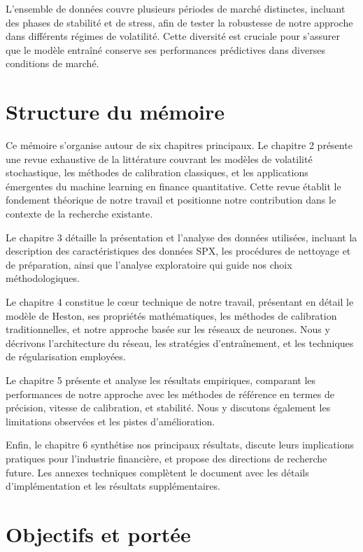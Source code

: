L'ensemble de données couvre plusieurs périodes de marché distinctes, incluant des phases de stabilité et de stress, afin de tester la robustesse de notre approche dans différents régimes de volatilité. Cette diversité est cruciale pour s'assurer que le modèle entraîné conserve ses performances prédictives dans diverses conditions de marché.

\section{Structure du mémoire}

Ce mémoire s'organise autour de six chapitres principaux. Le chapitre 2 présente une revue exhaustive de la littérature couvrant les modèles de volatilité stochastique, les méthodes de calibration classiques, et les applications émergentes du machine learning en finance quantitative. Cette revue établit le fondement théorique de notre travail et positionne notre contribution dans le contexte de la recherche existante.

Le chapitre 3 détaille la présentation et l'analyse des données utilisées, incluant la description des caractéristiques des données SPX, les procédures de nettoyage et de préparation, ainsi que l'analyse exploratoire qui guide nos choix méthodologiques.

Le chapitre 4 constitue le cœur technique de notre travail, présentant en détail le modèle de Heston, ses propriétés mathématiques, les méthodes de calibration traditionnelles, et notre approche basée sur les réseaux de neurones. Nous y décrivons l'architecture du réseau, les stratégies d'entraînement, et les techniques de régularisation employées.

Le chapitre 5 présente et analyse les résultats empiriques, comparant les performances de notre approche avec les méthodes de référence en termes de précision, vitesse de calibration, et stabilité. Nous y discutons également les limitations observées et les pistes d'amélioration.

Enfin, le chapitre 6 synthétise nos principaux résultats, discute leurs implications pratiques pour l'industrie financière, et propose des directions de recherche future. Les annexes techniques complètent le document avec les détails d'implémentation et les résultats supplémentaires.

\section{Objectifs et portée}

